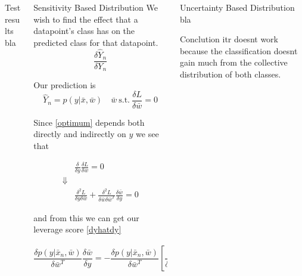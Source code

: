 \documentclass{beamer}
\newenvironment{pblock}{\begin{minipage}[b]{\linewidth}
	\begin{block}}{\end{block} 	\end{minipage}\vspace*{20pt}}
\begin{document}
{\begin{columns}[t]
\begin{column}{.3\linewidth}
	\begin{pblock}{Test results}
		bla
	\end{pblock}

	\end{column}
    \begin{column}{.3\linewidth}

	
	\begin{pblock}{Sensitivity Based Distribution}
	We wish to find the effect that a datapoint's class has on the predicted class for that datapoint.
	\begin{equation}
	\label{dyhatdy}
	\frac{\delta \hat{Y}_n}{\delta Y_n}
	\end{equation}
	
	Our prediction is 
	\begin{equation}
	\label{optimum}
	 \hat{Y}_n = p(y|\bar{x},\bar{w}) \quad \bar{w} \  \text{s.t.} \ \frac{\delta L}{\delta\bar{w}}=0
	\end{equation}
	
	Since \ref{optimum} depends both directly and indirectly on $y$ we see that
	
	\begin{eqnarray*}
	&\frac{\delta}{\delta y} \frac{\delta L}{\delta w} = 0\\
	\Downarrow & \\
	&\frac{\delta^2 L}{\delta y \delta \bar{w}} + \frac{\delta^2 L}{\delta \bar{w} \delta \bar{w}^T} \frac{\delta \bar{w}}{\delta y}= 0
	\end{eqnarray*}
	
	and from this we can get our leverage score \eqref{dyhatdy}
	
	\begin{equation}
	\frac{\delta p(y|\bar{x}_n,\bar{w})}{\delta \bar{w}^T} \frac{\delta \bar{w}}{\delta y} = - \frac{\delta p(y|\bar{x}_n,\bar{w})}{\delta \bar{w}^T} \left[ \frac{\delta^2 L}{\delta \bar{w} \delta \bar{w}^T} \right]^{-1} \frac{\delta^2 L}{\delta y \delta \bar{w}}
	\end{equation}
	\end{pblock}
	
	
    \end{column}
    \begin{column}{.3\linewidth}
    
    \begin{pblock}{Uncertainty Based Distribution}
    	bla
    	\end{pblock}
    
    
    	\begin{pblock}{Conclution}
		itr doesnt work because the classification doesnt gain much from the collective distribution of both classes.
		

\end{pblock}
\end{column}
\end{columns}}
\end{document}
